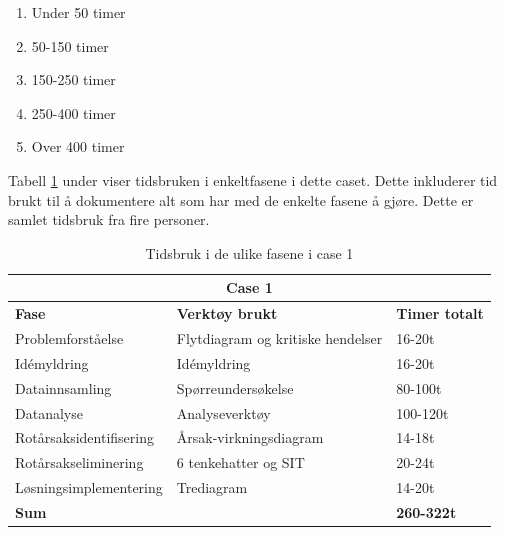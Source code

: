 \begin{enumerate}
    \item Under 50 timer
    \item 50-150 timer
    \item 150-250 timer
    \item 250-400 timer
    \item Over 400 timer
\end{enumerate}

Tabell \ref{tab:tidsbruk_case1} under viser tidsbruken i enkeltfasene i dette caset. Dette inkluderer tid brukt til å dokumentere alt som har med de enkelte fasene å gjøre. Dette er samlet tidsbruk fra fire personer. 

\begin{table}[H]
  \centering
  \caption{Tidsbruk i de ulike fasene i case 1}
    \begin{tabular}{|lr|l|}
    \hline
    \multicolumn{3}{|c|}{\cellcolor{yellow}\textbf{Case 1}} \\ 
    \hline
    \multicolumn{1}{|l|}{\cellcolor{apricot}\textbf{Fase}} & \multicolumn{1}{l|}{\cellcolor{apricot}\textbf{Verktøy brukt}} & \cellcolor{apricot}\textbf{Timer totalt} \\
    \hline
    \multicolumn{1}{|l|}{Problemforståelse} & \multicolumn{1}{l|}{Flytdiagram og kritiske hendelser} & 16-20t \\
    \hline
    \multicolumn{1}{|l|}{Idémyldring} & \multicolumn{1}{l|}{Idémyldring} & 16-20t \\
    \hline
    \multicolumn{1}{|l|}{Datainnsamling} & \multicolumn{1}{l|}{Spørreundersøkelse} & 80-100t \\
    \hline
    \multicolumn{1}{|l|}{Datanalyse} & \multicolumn{1}{l|}{Analyseverktøy} & 100-120t \\
    \hline
    \multicolumn{1}{|l|}{Rotårsaksidentifisering} & \multicolumn{1}{l|}{Årsak-virkningsdiagram} & 14-18t \\
    \hline
    \multicolumn{1}{|l|}{Rotårsakseliminering} & \multicolumn{1}{l|}{6 tenkehatter og SIT} & 20-24t \\
    \hline
    \multicolumn{1}{|l|}{Løsningsimplementering} & \multicolumn{1}{l|}{Trediagram} & 14-20t \\
    \hline
    \multicolumn{2}{|l|}{\textbf{Sum}} & \textbf{260-322t} \\
    \hline
    \end{tabular}%
  \label{tab:tidsbruk_case1}%
\end{table}%

